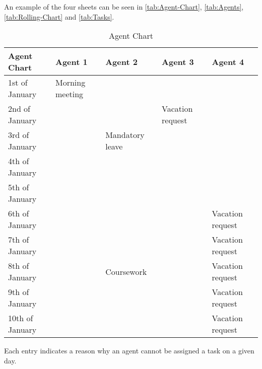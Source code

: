 An example of the four sheets can be seen in \autoref{tab:Agent-Chart}, \autoref{tab:Agents}, \autoref{tab:Rolling-Chart} and \autoref{tab:Tasks}.
\begin{table}[H]
    \centering
    \begin{tabular}{|l|l|l|l|l|}
        \hline
        \textbf{Agent Chart} & \textbf{Agent 1} & \textbf{Agent 2} & \textbf{Agent 3} & \textbf{Agent 4} \\ \hline
        1st of January       & Morning meeting  &                  &                  &                  \\ \hline
        2nd of January       &                  &                  & Vacation request &                  \\ \hline
        3rd of January       &                  & Mandatory leave  &                  &                  \\ \hline
        4th of January       &                  &                  &                  &                  \\ \hline
        5th of January       &                  &                  &                  &                  \\ \hline
        6th of January       &                  &                  &                  & Vacation request \\ \hline
        7th of January       &                  &                  &                  & Vacation request \\ \hline
        8th of January       &                  & Coursework       &                  & Vacation request \\ \hline
        9th of January       &                  &                  &                  & Vacation request \\ \hline
        10th of January      &                  &                  &                  & Vacation request \\ \hline
    \end{tabular}
    \caption{Agent Chart}
    \small
    \raggedright
    Each entry indicates a reason why an agent cannot be assigned a task on a given day.
    \label{tab:Agent-Chart}
\end{table}


